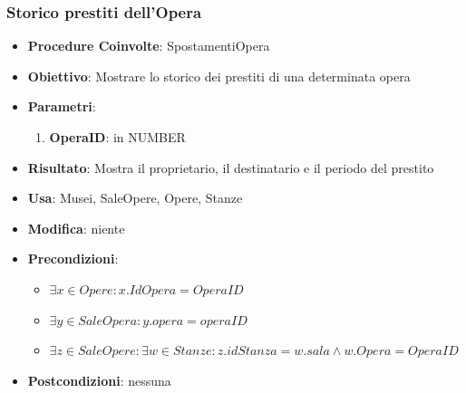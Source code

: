 \subsubsection{Storico prestiti dell’Opera}
\begin{itemize}
    \item \textbf{Procedure Coinvolte}: SpostamentiOpera
    \item \textbf{Obiettivo}: Mostrare lo storico dei prestiti di una determinata opera
    \item \textbf{Parametri}:
	\begin{enumerate}
		\item \textbf{OperaID}: in NUMBER
	\end{enumerate}
	\item \textbf{Risultato}: Mostra il proprietario, il destinatario e il periodo del prestito
	\item \textbf{Usa}: Musei, SaleOpere, Opere, Stanze
	\item \textbf{Modifica}: niente
	\item \textbf{Precondizioni}:
	\begin{itemize}
		\item $\exists x \in Opere : x.IdOpera = OperaID$
		\item $\exists y \in SaleOpera : y.opera = operaID$
		\item $\exists z \in SaleOpere : \exists w \in Stanze : z.idStanza = w.sala \land w.Opera = OperaID$
	\end{itemize}
	\item \textbf{Postcondizioni}: nessuna
\end{itemize}

